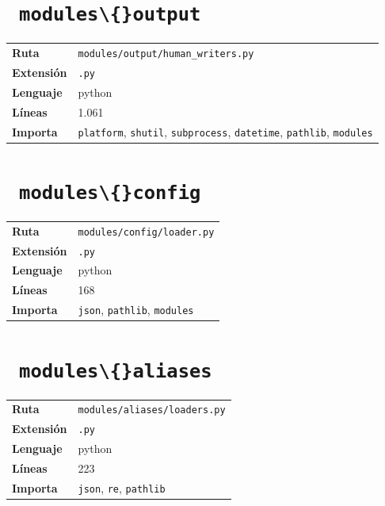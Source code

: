 \documentclass[12pt, a4paper]{report}
\begin{document}
\medskip

\section{\ \texttt{modules\textbackslash\{\}output}}

\begin{fichabox}
\small
\begin{tabular}{@{}ll@{}}
  \textbf{Ruta} & \texttt{modules/output/human\_writers.py} \\
  \textbf{Extensión} & \texttt{.py} \\
  \textbf{Lenguaje} & python \\
  \textbf{Líneas} & 1.061 \\
  \textbf{Importa} & \parbox[t]{10cm}{\texttt{platform}, \texttt{shutil}, \texttt{subprocess}, \texttt{datetime}, \texttt{pathlib}, \texttt{modules}} \\
\end{tabular}
\end{fichabox}

\medskip

\section{\ \texttt{modules\textbackslash\{\}config}}

\begin{fichabox}
\small
\begin{tabular}{@{}ll@{}}
  \textbf{Ruta} & \texttt{modules/config/loader.py} \\
  \textbf{Extensión} & \texttt{.py} \\
  \textbf{Lenguaje} & python \\
  \textbf{Líneas} & 168 \\
  \textbf{Importa} & \parbox[t]{10cm}{\texttt{json}, \texttt{pathlib}, \texttt{modules}} \\
\end{tabular}
\end{fichabox}

\medskip

\section{\ \texttt{modules\textbackslash\{\}aliases}}

\begin{fichabox}
\small
\begin{tabular}{@{}ll@{}}
  \textbf{Ruta} & \texttt{modules/aliases/loaders.py} \\
  \textbf{Extensión} & \texttt{.py} \\
  \textbf{Lenguaje} & python \\
  \textbf{Líneas} & 223 \\
  \textbf{Importa} & \parbox[t]{10cm}{\texttt{json}, \texttt{re}, \texttt{pathlib}} \\
\end{tabular}
\end{fichabox}
\end{document}
